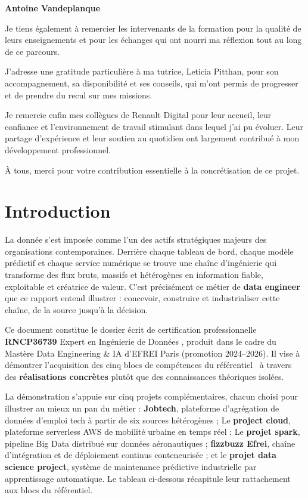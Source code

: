 \documentclass{article}
\begin{document}
\medskip
\noindent\textbf{Antoine Vandeplanque}

Je tiens également à remercier les intervenants de la formation pour la qualité de leurs enseignements
et pour les échanges qui ont nourri ma réflexion tout au long de ce parcours.

J'adresse une gratitude particulière à ma tutrice, Leticia Pitthan, pour son accompagnement, sa
disponibilité et ses conseils, qui m'ont permis de progresser et de prendre du recul sur mes missions.

Je remercie enfin mes collègues de Renault Digital pour leur accueil, leur confiance et l'environnement
de travail stimulant dans lequel j'ai pu évoluer. Leur partage d'expérience et leur soutien au
quotidien ont largement contribué à mon développement professionnel.

\medskip
\noindent À tous, merci pour votre contribution essentielle à la concrétisation de ce
projet.

\newpage
\section{Introduction}

La donnée s'est imposée comme l'un des actifs stratégiques majeurs des organisations
contemporaines. Derrière chaque tableau de bord, chaque modèle prédictif et chaque
service numérique se trouve une chaîne d'ingénierie qui transforme des flux bruts,
massifs et hétérogènes en information fiable, exploitable et créatrice de valeur.
C'est précisément ce métier de \textbf{data engineer} que ce rapport entend illustrer
: concevoir, construire et industrialiser cette chaîne, de la source jusqu'à la décision.

Ce document constitue le dossier écrit de certification professionnelle \textbf{RNCP36739}
\og{} Expert en Ingénierie de Données \fg{}, produit dans le cadre du Mastère Data Engineering \& IA
d'EFREI Paris (promotion 2024--2026). Il vise à démontrer l'acquisition des cinq blocs de compétences
du référentiel~\cite{rncp} à travers des \textbf{réalisations concrètes} plutôt que des connaissances
théoriques isolées.

La démonstration s'appuie sur cinq projets complémentaires, chacun choisi pour
illustrer au mieux un pan du métier : \textbf{Jobtech}, plateforme d'agrégation de
données d'emploi tech à partir de six sources hétérogènes ; Le \textbf{project cloud},
plateforme serverless AWS de mobilité urbaine en temps réel ; Le \textbf{projet spark},
pipeline Big Data distribué sur données aéronautiques ; \textbf{fizzbuzz Efrei},
chaîne d'intégration et de déploiement continus conteneurisée ; et le
\textbf{projet data science project}, système de maintenance prédictive industrielle par
apprentissage automatique. Le tableau ci-dessous récapitule leur rattachement aux
blocs du référentiel.
\end{document}
